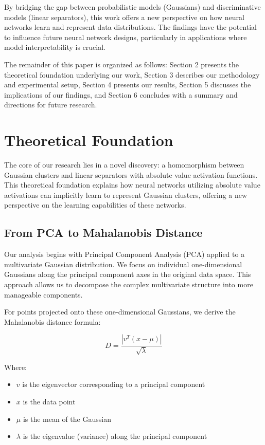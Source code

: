 \documentclass[11pt]{article}
\begin{document}
By bridging the gap between probabilistic models (Gaussians) and discriminative models (linear 
separators), this work offers a new perspective on how neural networks learn and represent data 
distributions. The findings have the potential to influence future neural network designs, 
particularly in applications where model interpretability is crucial.

The remainder of this paper is organized as follows: Section 2 presents the theoretical foundation 
underlying our work, Section 3 describes our methodology and experimental setup, Section 4 
presents our results, Section 5 discusses the implications of our findings, and Section 6 
concludes with a summary and directions for future research.

\section{Theoretical Foundation}
The core of our research lies in a novel discovery: a homomorphism between Gaussian clusters and 
linear separators with absolute value activation functions. This theoretical foundation explains how neural networks utilizing absolute value activations can implicitly learn to represent Gaussian clusters, offering a new perspective on the learning capabilities of these networks.

\subsection{From PCA to Mahalanobis Distance}
Our analysis begins with Principal Component Analysis (PCA) applied to a multivariate Gaussian distribution. We focus on individual one-dimensional Gaussians along the principal component axes in the original data space. This approach allows us to decompose the complex multivariate structure into more manageable components.

For points projected onto these one-dimensional Gaussians, we derive the Mahalanobis distance formula:

\begin{equation}
D = \frac{|v^T(x - \mu)|}{\sqrt{\lambda}}
\end{equation}

Where:

\begin{itemize}
\item $v$ is the eigenvector corresponding to a principal component
\item $x$ is the data point
\item $\mu$ is the mean of the Gaussian
\item $\lambda$ is the eigenvalue (variance) along the principal component
\end{itemize}
\end{document}
